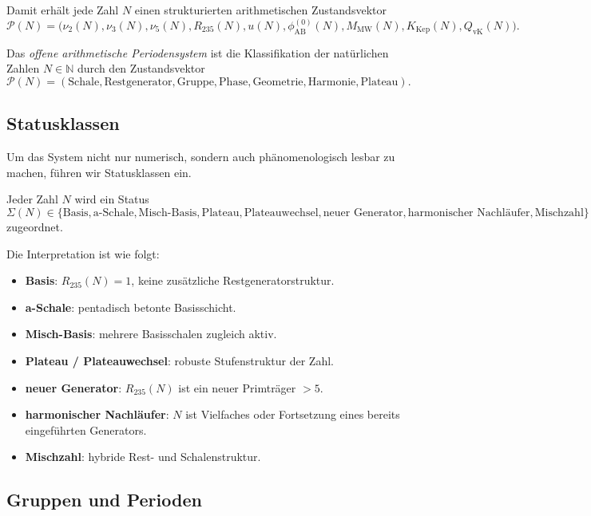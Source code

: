 Damit erhält jede Zahl \(N\) einen strukturierten arithmetischen Zustandsvektor
\[
\mathcal P(N)
=
\bigl(
\nu_2(N),\nu_3(N),\nu_5(N),
R_{235}(N),
u(N),
\phi_{\mathrm{AB}}^{(0)}(N),
M_{\mathrm{MW}}(N),
K_{\mathrm{Kep}}(N),
Q_{\mathrm{vK}}(N)
\bigr).
\]

\begin{definition}
	Das \emph{offene arithmetische Periodensystem} ist die Klassifikation der natürlichen Zahlen \(N\in\mathbb{N}\) durch den Zustandsvektor
	\[
	\mathcal P(N)
	=
	(\text{Schale},\text{Restgenerator},\text{Gruppe},\text{Phase},\text{Geometrie},\text{Harmonie},\text{Plateau}).
	\]
\end{definition}

\subsection{Statusklassen}

Um das System nicht nur numerisch, sondern auch phänomenologisch lesbar zu machen, führen wir Statusklassen ein.

\begin{definition}[Status]
	Jeder Zahl \(N\) wird ein Status
	\[
	\Sigma(N)\in
	\{
	\text{Basis},
	\text{a-Schale},
	\text{Misch-Basis},
	\text{Plateau},
	\text{Plateauwechsel},
	\text{neuer Generator},
	\text{harmonischer Nachläufer},
	\text{Mischzahl}
	\}
	\]
	zugeordnet.
\end{definition}

Die Interpretation ist wie folgt:
\begin{itemize}
	\item \textbf{Basis}: \(R_{235}(N)=1\), keine zusätzliche Restgeneratorstruktur.
	\item \textbf{a-Schale}: pentadisch betonte Basisschicht.
	\item \textbf{Misch-Basis}: mehrere Basisschalen zugleich aktiv.
	\item \textbf{Plateau / Plateauwechsel}: robuste Stufenstruktur der Zahl.
	\item \textbf{neuer Generator}: \(R_{235}(N)\) ist ein neuer Primträger \(>5\).
	\item \textbf{harmonischer Nachläufer}: \(N\) ist Vielfaches oder Fortsetzung eines bereits eingeführten Generators.
	\item \textbf{Mischzahl}: hybride Rest- und Schalenstruktur.
\end{itemize}

\subsection{Gruppen und Perioden}

